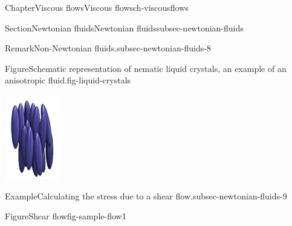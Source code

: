 \documentclass[oneside,10pt,]{book}
\numberwithin{equation}{section}
\begin{document}
\begin{chapterptx}{Chapter}{Viscous flows}{}{Viscous flows}{}{}{ch-viscousflows}
\begin{sectionptx}{Section}{Newtonian fluids}{}{Newtonian fluids}{}{}{subsec-newtonian-fluids}
\begin{remark}{Remark}{Non-Newtonian fluids.}{subsec-newtonian-fluids-8}
\begin{itemize}[label=\textbullet]
\begin{figureptx}{Figure}{Schematic representation of nematic liquid crystals, an example of an anisotropic fluid.}{fig-liquid-crystals}{}
\begin{image}{0.35}{0.3}{0.35}{}
\includegraphics[width=\linewidth]{external/ch-chapter07-liquid-crystals.jpg}
\end{image}%
\tcblower
\end{figureptx}%
\end{itemize}
%
\end{remark}
\begin{example}{Example}{Calculating the stress due to a shear flow.}{subsec-newtonian-fluids-9}%
\begin{figureptx}{Figure}{Shear flow}{fig-sample-flow1}{}%
\begin{image}{0.25}{0.5}{0.25}{}%

\end{image}
\end{figureptx}
\end{example}
\end{sectionptx}
\end{chapterptx}
\end{document}
